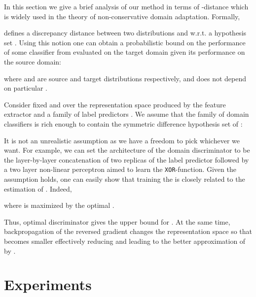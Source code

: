 \documentclass{article}
\begin{document}
In this section we give a brief analysis of our method in terms of -distance \cite{Ben10,Cortes11} which is widely used in the theory of non-conservative domain adaptation. Formally,

defines a discrepancy distance between two distributions  and  w.r.t. a hypothesis set . Using this notion one can obtain a probabilistic bound \cite{Ben10} on the performance  of some classifier  from  evaluated on the target domain given its performance  on the source domain:

where  and  are source and target distributions respectively, and  does not depend on particular . 

Consider fixed  and  over the representation space produced by the feature extractor  and a family of label predictors . We assume that the family of domain classifiers  is rich enough to contain the symmetric difference hypothesis set of :

It is not an unrealistic assumption as we have a freedom to pick  whichever we want. For example, we can set the architecture of the domain discriminator to be the layer-by-layer concatenation of two replicas of the label predictor followed by a two layer non-linear perceptron aimed to learn the \texttt{XOR}-function. Given the assumption holds, one can easily show that training the  is closely related to the estimation of . Indeed, 

where  is maximized by the optimal .

Thus, optimal discriminator gives the upper bound for . At the same time, backpropagation of the reversed gradient changes the representation space so that  becomes smaller effectively reducing  and leading to the better approximation of  by .
 \section{Experiments}
\label{sect:experiments}
\end{document}

